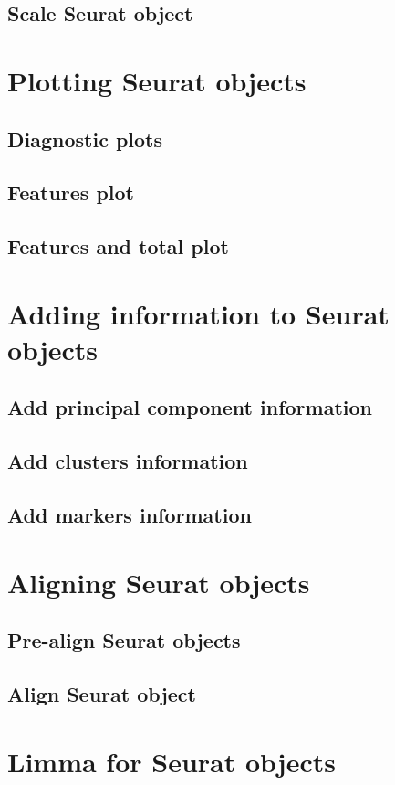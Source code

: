 \subsection{Scale Seurat object}

\section{Plotting Seurat objects}
\subsection{Diagnostic plots}\label{subsec:DiagnosticPlots}
\subsection{Features plot}
\subsection{Features and total plot}

\section{Adding information to Seurat objects}
\subsection{Add principal component information}
\subsection{Add clusters information}
\subsection{Add markers information}

\section{Aligning Seurat objects}
\subsection{Pre-align Seurat objects}
\subsection{Align Seurat object}

\section{Limma for Seurat objects}\label{sec:LimmaSeurat}
